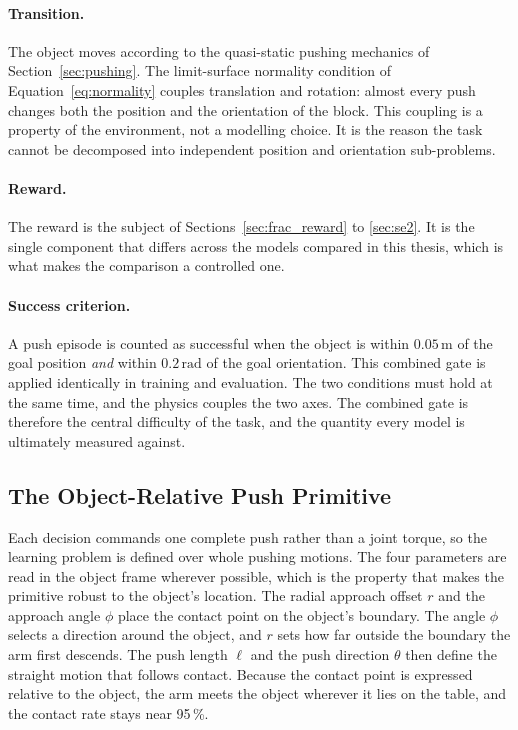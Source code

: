 \paragraph{Transition.}
The object moves according to the quasi-static pushing mechanics of
Section~\ref{sec:pushing}. The limit-surface normality condition of
Equation~\ref{eq:normality} couples translation and rotation: almost every push
changes both the position and the orientation of the block. This coupling is a
property of the environment, not a modelling choice. It is the reason the task
cannot be decomposed into independent position and orientation sub-problems.

\paragraph{Reward.}
The reward is the subject of Sections~\ref{sec:frac_reward} to \ref{sec:se2}. It
is the single component that differs across the models compared in this thesis,
which is what makes the comparison a controlled one.

\paragraph{Success criterion.}
A push episode is counted as successful when the object is within
$0.05\,\text{m}$ of the goal position \emph{and} within $0.2\,\text{rad}$ of the
goal orientation. This combined gate is applied identically in training and
evaluation. The two conditions must hold at the same time, and the physics couples
the two axes. The combined gate is therefore the central difficulty of the task,
and the quantity every model is ultimately measured against.

\subsection{The Object-Relative Push Primitive}
\label{sec:primitive}

Each decision commands one complete push rather than a joint torque, so the
learning problem is defined over whole pushing motions. The four parameters are
read in the object frame wherever possible, which is the property that makes the
primitive robust to the object's location. The radial approach offset $r$ and the
approach angle $\phi$ place the contact point on the object's boundary. The angle
$\phi$ selects a direction around the object, and $r$ sets how far outside the
boundary the arm first descends. The push length $\ell$ and the push direction
$\theta$ then define the straight motion that follows contact. Because the contact
point is expressed relative to the object, the arm meets the object wherever it
lies on the table, and the contact rate stays near 95\,\%.

